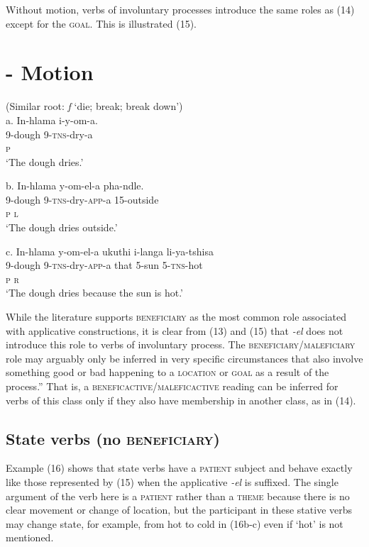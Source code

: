   Without motion, verbs of involuntary processes introduce the same roles as (14) except for the \textsc{goal. }This is illustrated (15).

\chapter[{}- Motion   ]{{}- Motion   }
     (Similar root: \textit{f} ‘die; break; break down’)\\
\gll a.  In-hlama      i-y-om-a. \\
         9-dough          9-\textsc{tns}{}-dry-a  \\
         \textsc{p }\\
\glt     ‘The dough dries.’
\z

\gll   b.  In-hlama    y-om-el-a            pha-ndle. \\
         9-dough      9-\textsc{tns}{}-dry-\textsc{app}{}-a    15-outside \\
         \textsc{p                  l}\\
\glt     ‘The dough dries outside.’
\z

\gll   c.  In-hlama    y-om-el-a             ukuthi    i-langa    li-ya-tshisa \\
         9-dough      9-\textsc{tns}{}-dry-\textsc{app}{}-a  that     5-sun    5-\textsc{tns}{}-hot\\
         \textsc{p                r}\\
\glt     ‘The dough dries because the sun is hot.’ 
\z

While the literature supports \textsc{beneficiary} as the most common role associated with applicative constructions, it is clear from (13) and (15) that \textit{{}-el} does not introduce this role to verbs of involuntary process. The \textsc{beneficiary}/\textsc{maleficiary} role may arguably only be inferred in very specific circumstances that also involve something good or bad happening to a \textsc{location} or \textsc{goal} as a result of the process.” That is, a \textsc{beneficactive}/\textsc{maleficactive} reading can be inferred for verbs of this class only if they also have membership in another class, as in (14).

\section{State verbs (no \textsc{beneficiary)}}

Example (16) shows that state verbs have a \textsc{patient} subject and behave exactly like those represented by (15) when the applicative \textit{{}-el} is suffixed. The single argument of the verb here is a \textsc{patient} rather than a \textsc{theme} because there is no clear movement or change of location, but the participant in these stative verbs may change state, for example, from hot to cold in (16b-c) even if ‘hot’ is not mentioned. 


